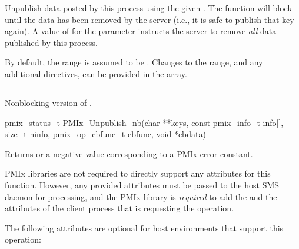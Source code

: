 Unpublish data posted by this process using the given .
The function will block until the data has been removed by the server (i.e., it is safe to publish that key again).
A value of  for the  parameter instructs the server to remove \emph{all} data published by this process.

By default, the range is assumed to be .
Changes to the range, and any additional directives, can be provided in the  array.


\subsection{}

\summary

Nonblocking version of .

\format

\cspecificstart
\begin{codepar}
pmix_status_t
PMIx_Unpublish_nb(char **keys,
                  const pmix_info_t info[], size_t ninfo,
                  pmix_op_cbfunc_t cbfunc, void *cbdata)
\end{codepar}
\cspecificend

\begin{arglist}
\end{arglist}

Returns  or a negative value corresponding to a PMIx error constant.

\reqattrstart
\ac{PMIx} libraries are not required to directly support any attributes for this function. However, any provided attributes must be passed to the host \ac{SMS} daemon for processing, and the \ac{PMIx} library is \textit{required} to add the  and the  attributes of the client process that is requesting the operation.

\reqattrend

\optattrstart
The following attributes are optional for host environments that support this operation:

